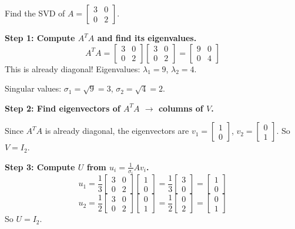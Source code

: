 \documentclass[11pt]{article}
\theoremstyle{definition}
\theoremstyle{plain}
\theoremstyle{remark}
\begin{document}
\begin{workedexample}[title=\textbf{Worked Example: SVD of a $2 \times 2$ matrix}]
Find the SVD of $A = \begin{bmatrix}3 & 0\\0 & 2\end{bmatrix}$.

\textbf{Step 1: Compute $A^T A$ and find its eigenvalues.}
\[
A^T A = \begin{bmatrix}3&0\\0&2\end{bmatrix}\begin{bmatrix}3&0\\0&2\end{bmatrix} = \begin{bmatrix}9&0\\0&4\end{bmatrix}
\]
This is already diagonal! Eigenvalues: $\lambda_1 = 9$, $\lambda_2 = 4$.

Singular values: $\sigma_1 = \sqrt{9} = 3$, $\sigma_2 = \sqrt{4} = 2$.

\textbf{Step 2: Find eigenvectors of $A^T A$ $\to$ columns of $V$.}

Since $A^T A$ is already diagonal, the eigenvectors are $v_1 = \begin{bmatrix}1\\0\end{bmatrix}$, $v_2 = \begin{bmatrix}0\\1\end{bmatrix}$. So $V = I_2$.

\textbf{Step 3: Compute $U$ from $u_i = \frac{1}{\sigma_i} Av_i$.}
\[
u_1 = \frac{1}{3}\begin{bmatrix}3&0\\0&2\end{bmatrix}\begin{bmatrix}1\\0\end{bmatrix} = \frac{1}{3}\begin{bmatrix}3\\0\end{bmatrix} = \begin{bmatrix}1\\0\end{bmatrix}
\]
\[
u_2 = \frac{1}{2}\begin{bmatrix}3&0\\0&2\end{bmatrix}\begin{bmatrix}0\\1\end{bmatrix} = \frac{1}{2}\begin{bmatrix}0\\2\end{bmatrix} = \begin{bmatrix}0\\1\end{bmatrix}
\]
So $U = I_2$.


\end{workedexample}
\end{document}
